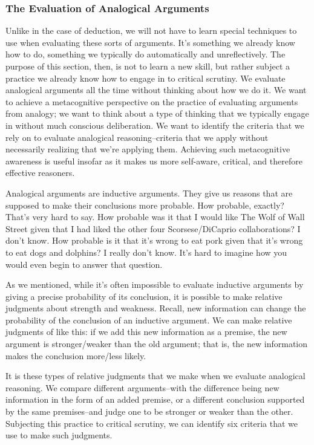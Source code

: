 \subsubsection{The Evaluation of Analogical Arguments}
Unlike in the case of deduction, we will not have to learn special techniques to use when evaluating
these sorts of arguments. It's something we already know how to do, something we typically do
automatically and unreflectively. The purpose of this section, then, is not to learn a new skill, but
rather subject a practice we already know how to engage in to critical scrutiny. We evaluate
analogical arguments all the time without thinking about how we do it. We want to achieve a
metacognitive perspective on the practice of evaluating arguments from analogy; we want to think
about a type of thinking that we typically engage in without much conscious deliberation. We want
to identify the criteria that we rely on to evaluate analogical reasoning--criteria that we apply
without necessarily realizing that we're applying them. Achieving such metacognitive awareness
is useful insofar as it makes us more self-aware, critical, and therefore effective reasoners.

Analogical arguments are inductive arguments. They give us reasons that are supposed to make
their conclusions more probable. How probable, exactly? That's very hard to say. How probable
was it that I would like The Wolf of Wall Street given that I had liked the other four
Scorsese/DiCaprio collaborations? I don't know. How probable is it that it's wrong to eat pork
given that it's wrong to eat dogs and dolphins? I really don't know. It's hard to imagine how you
would even begin to answer that question.

As we mentioned, while it's often impossible to evaluate inductive arguments by giving a precise
probability of its conclusion, it is possible to make relative judgments about strength and
weakness. Recall, new information can change the probability of the conclusion of an inductive
argument. We can make relative judgments of like this: if we add this new information as a
premise, the new argument is stronger/weaker than the old argument; that is, the new information
makes the conclusion more/less likely.

It is these types of relative judgments that we make when we evaluate analogical reasoning. We
compare different arguments--with the difference being new information in the form of an added
premise, or a different conclusion supported by the same premises--and judge one to be stronger
or weaker than the other. Subjecting this practice to critical scrutiny, we can identify six criteria
that we use to make such judgments.

